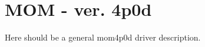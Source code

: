 \clearpage
\section{MOM - ver. 4p0d\label{sec:mom4p0d}}

Here should be a general mom4p0d driver description.




